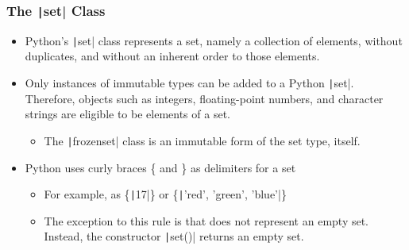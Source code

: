 \begin{frame}
    \frametitle{The \texttt|set| Class}

    \begin{itemize}
        \item Python's \texttt|set| class represents a set, namely a collection of elements, without duplicates, and without an inherent order to those elements.
        \item Only instances of immutable types can be added to a Python \texttt|set|. Therefore, objects such as integers, floating-point numbers, and character strings are eligible to be elements of a set.
              \begin{itemize}
                  \item The \texttt|frozenset| class is an immutable form of the set type, itself.
              \end{itemize}
        \item Python uses curly braces \{ and \} as delimiters for a set
              \begin{itemize}
                  \item For example, as \{\texttt|17|\} or \{\texttt|'red', 'green', 'blue'|\}
                  \item  The exception to this rule is that { } does not represent an empty set. Instead, the constructor \texttt|set()| returns an empty set.
              \end{itemize}

    \end{itemize}
\end{frame}

